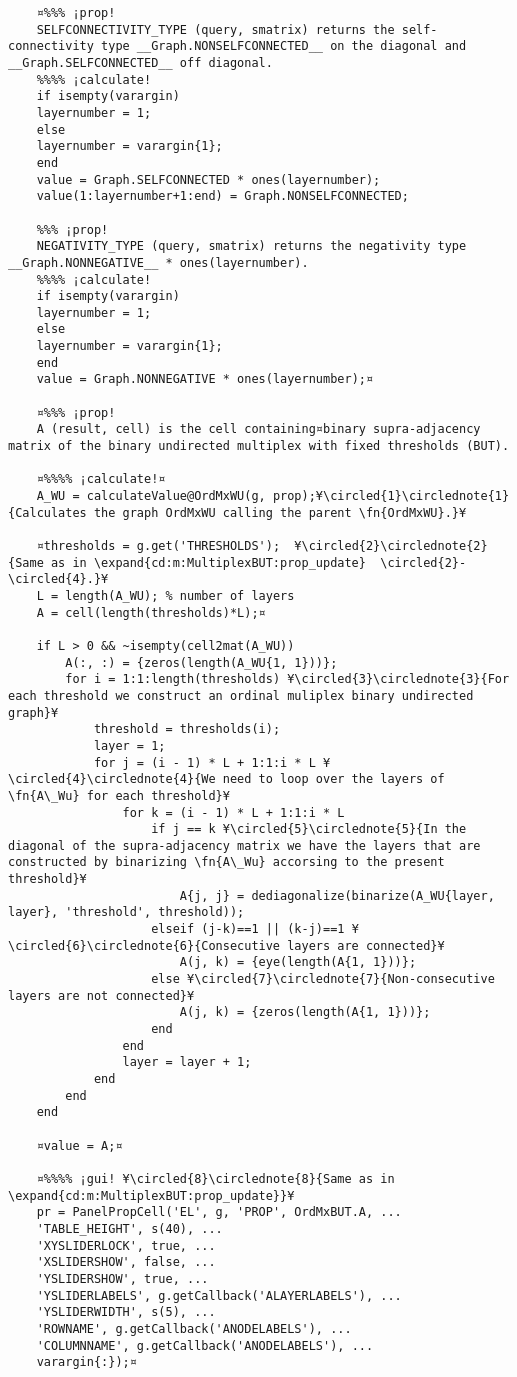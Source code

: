 \documentclass{tufte-handout}
\begin{document}
\begin{lstlisting}
	¤%%% ¡prop!
	SELFCONNECTIVITY_TYPE (query, smatrix) returns the self-connectivity type __Graph.NONSELFCONNECTED__ on the diagonal and __Graph.SELFCONNECTED__ off diagonal.
	%%%% ¡calculate!
	if isempty(varargin)
	layernumber = 1;
	else
	layernumber = varargin{1};
	end
	value = Graph.SELFCONNECTED * ones(layernumber);
	value(1:layernumber+1:end) = Graph.NONSELFCONNECTED;                
	
	%%% ¡prop!
	NEGATIVITY_TYPE (query, smatrix) returns the negativity type __Graph.NONNEGATIVE__ * ones(layernumber).
	%%%% ¡calculate!
	if isempty(varargin)
	layernumber = 1;
	else
	layernumber = varargin{1};
	end
	value = Graph.NONNEGATIVE * ones(layernumber);¤
	
	¤%%% ¡prop!
	A (result, cell) is the cell containing¤binary supra-adjacency matrix of the binary undirected multiplex with fixed thresholds (BUT).
	
	¤%%%% ¡calculate!¤
	A_WU = calculateValue@OrdMxWU(g, prop);¥\circled{1}\circlednote{1}{Calculates the graph OrdMxWU calling the parent \fn{OrdMxWU}.}¥
	
	¤thresholds = g.get('THRESHOLDS');  ¥\circled{2}\circlednote{2}{Same as in \expand{cd:m:MultiplexBUT:prop_update}  \circled{2}-\circled{4}.}¥
	L = length(A_WU); % number of layers 
	A = cell(length(thresholds)*L);¤
	
	if L > 0 && ~isempty(cell2mat(A_WU))
		A(:, :) = {zeros(length(A_WU{1, 1}))};
		for i = 1:1:length(thresholds) ¥\circled{3}\circlednote{3}{For each threshold we construct an ordinal muliplex binary undirected graph}¥
			threshold = thresholds(i);
			layer = 1;
			for j = (i - 1) * L + 1:1:i * L ¥\circled{4}\circlednote{4}{We need to loop over the layers of \fn{A\_Wu} for each threshold}¥
				for k = (i - 1) * L + 1:1:i * L
					if j == k ¥\circled{5}\circlednote{5}{In the diagonal of the supra-adjacency matrix we have the layers that are constructed by binarizing \fn{A\_Wu} accorsing to the present threshold}¥
						A{j, j} = dediagonalize(binarize(A_WU{layer, layer}, 'threshold', threshold));
					elseif (j-k)==1 || (k-j)==1 ¥\circled{6}\circlednote{6}{Consecutive layers are connected}¥
						A(j, k) = {eye(length(A{1, 1}))};
					else ¥\circled{7}\circlednote{7}{Non-consecutive layers are not connected}¥
						A(j, k) = {zeros(length(A{1, 1}))};
					end
				end
				layer = layer + 1;
			end
		end
	end
	
	¤value = A;¤
	
	¤%%%% ¡gui! ¥\circled{8}\circlednote{8}{Same as in \expand{cd:m:MultiplexBUT:prop_update}}¥
	pr = PanelPropCell('EL', g, 'PROP', OrdMxBUT.A, ...
	'TABLE_HEIGHT', s(40), ...
	'XYSLIDERLOCK', true, ... 
	'XSLIDERSHOW', false, ...
	'YSLIDERSHOW', true, ...
	'YSLIDERLABELS', g.getCallback('ALAYERLABELS'), ...
	'YSLIDERWIDTH', s(5), ...
	'ROWNAME', g.getCallback('ANODELABELS'), ...
	'COLUMNNAME', g.getCallback('ANODELABELS'), ...
	varargin{:});¤
	

\end{lstlisting}
\end{document}
